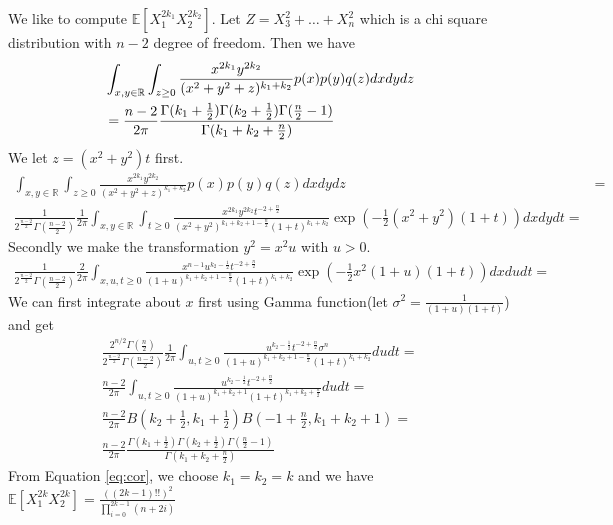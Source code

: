 \documentclass{article}
\def\E{\mathbb{E}}
\begin{document}
We like to compute $\E[X_1^{2k_1} X_2^{2k_2}]$. Let $ Z = X_3^2 + \dots + X_n^2$ which is a chi square distribution with $n-2$ degree of freedom.
Then we have
\begin{align}\label{eq:cor}
&\int_{x,y\in \mathbb{R}}\int_{z\geq 0} \frac{x^{2k_1} y^{2k_2}}{(x^2+y^2+z)^{k_1 + k_2}} p(x)p(y)q(z) dxdydz \notag\\
&=\frac{n-2}{2\pi} \frac{\Gamma(k_1 + \frac{1}{2}) \Gamma(k_2 + \frac{1}{2})\Gamma(\frac{n}{2}-1)}{\Gamma(k_1 + k_2 + \frac{n}{2})}
\end{align}
We let $z=(x^2+y^2)t$ first.
\begin{align*}
\int_{x,y\in \mathbb{R}}\int_{z\geq 0} \frac{x^{2k_1} y^{2k_2}}{(x^2+y^2+z)^{k_1 + k_2}} p(x)p(y)q(z) dxdydz & =\\
\frac{1}{2^{\frac{n-2}{2}}\Gamma(\frac{n-2}{2})}\frac{1}{2\pi} \int_{x,y\in \mathbb{R}}\int_{t\geq 0}\frac{x^{2k_1} y^{2k_2}t^{-2+\frac{n}{2}}}{(x^2+y^2)^{k_1 + k_2+1-\frac{n}{2}}(1+t)^{k_1 + k_2}}\exp(-\frac{1}{2}(x^2+y^2)(1+t))dxdydt =
\end{align*}
Secondly we make the transformation $y^2=x^2u$ with $u>0$.
\begin{align*}
\frac{1}{2^{\frac{n-2}{2}}\Gamma(\frac{n-2}{2})}\frac{2}{2\pi}\int_{x,u,t\geq 0}\frac{x^{n-1} u^{k_2 - \frac{1}{2}}t^{-2+\frac{n}{2}}}{(1+u)^{k_1 + k_2+1-\frac{n}{2}}(1+t)^{k_1 + k_2}}\exp(-\frac{1}{2}x^2(1+u)(1+t))dxdudt =
\end{align*}
We can first integrate about $x$ first using Gamma function(let $\sigma^2 = \frac{1}{(1+u)(1+t)}$)
and get
\begin{align*}
\frac{2^{n/2} \Gamma(\frac{n}{2})}{2^{\frac{n-2}{2}}\Gamma(\frac{n-2}{2})}\frac{1}{2\pi}\int_{u,t\geq 0} \frac{u^{k_2 - \frac{1}{2}}t^{-2+\frac{n}{2}}\sigma^n}{(1+u)^{k_1 + k_2+1-\frac{n}{2}}(1+t)^{k_1 + k_2}}dudt = \\
\frac{n-2}{2\pi}\int_{u,t\geq 0} \frac{u^{k_2 - \frac{1}{2}}t^{-2+\frac{n}{2}}}{(1+u)^{k_1 + k_2+1}(1+t)^{k_1 + k_2 + \frac{n}{2}}}dudt = \\
\frac{n-2}{2\pi} B(k_2 + \frac{1}{2}, k_1 + \frac{1}{2}) B(-1+\frac{n}{2}, k_1 + k_2 + 1) =\\
\frac{n-2}{2\pi} \frac{\Gamma(k_1 + \frac{1}{2}) \Gamma(k_2 + \frac{1}{2})\Gamma(\frac{n}{2}-1)}{\Gamma(k_1 + k_2 + \frac{n}{2})}
\end{align*}
From Equation \eqref{eq:cor}, we choose $k_1 = k_2 = k$ and we have
$\E[X_1^{2k}X_2^{2k}]=\frac{((2k-1)!!)^2}{\prod_{i=0}^{2k-1} (n + 2i)}$
\end{document}
